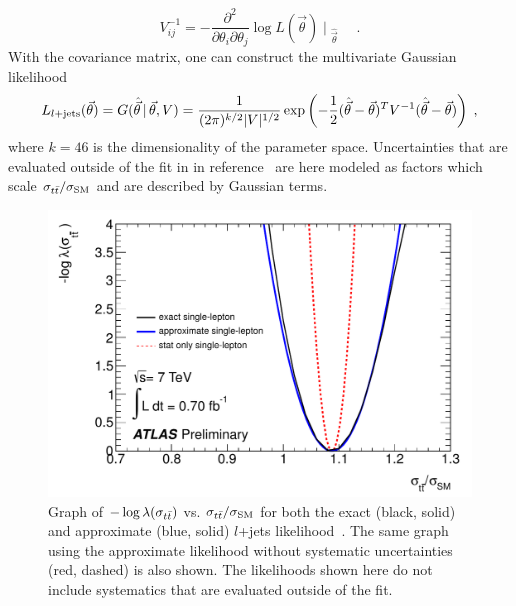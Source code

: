\begin{equation}
  V_{ij}^{-1} = - \frac{\partial^2 }{\partial \theta_i \partial \theta_j} \log L(\vec{\theta})\; {\bigg | \;}_{\hat{\vec{\theta}}} \; \quad .
\end{equation}
With the covariance matrix, one can construct the multivariate Gaussian likelihood 
\begin{equation} \label{eqn:ljetsLikelihood}
  L_{l+\rm jets}(\vec{\theta}) = G(\hat{\vec{\theta}}\, |\, \vec{\theta}, V) = \frac{1}{(2\pi)^{k/2} | V|^{1/2}} \exp\left( -\frac{1}{2} (\hat{\vec{\theta}} - \vec{\theta})^T  V^{-1} (\hat{\vec{\theta}} - \vec{\theta})  \right) \;, 
\end{equation}
where $k=46$ is the dimensionality of the parameter space.  
Uncertainties that are evaluated outside of the fit in in reference~\cite{LEPTON_JETS_NOTE_2011} are here modeled as factors which scale $\sigma_{t\bar{t}}/\sigma_{\rm SM}$ and are described by Gaussian terms.


\begin{figure}[htbp]
  \begin{center}
    \includegraphics[width=.5\textwidth]{figures/comb/ljets_likelihood_curve}
    \caption{Graph of $-\log\lambda(\sigma_{t\bar{t}})$ vs. $\sigma_{t\bar{t}}/\sigma_{\rm SM}$ for both the exact (black, solid) and approximate (blue, solid) $l$+jets likelihood~\cite{lepjetsCONF}.  The same graph using the approximate likelihood without systematic uncertainties (red, dashed) is also shown.  The likelihoods shown here do not include systematics that are evaluated outside of the fit.}
    \label{fig:ljets_combined}
  \end{center}
\end{figure}

